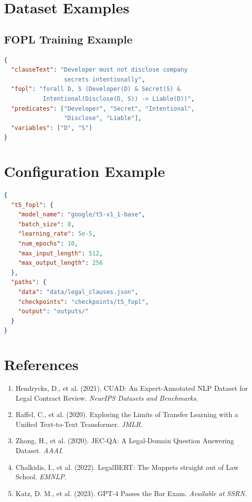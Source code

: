 \documentclass[12pt,a4paper]{article}
\begin{document}
\section{Dataset Examples}

\subsection{FOPL Training Example}

\begin{lstlisting}[language=json]
{
  "clauseText": "Developer must not disclose company 
                 secrets intentionally",
  "fopl": "forall D, S (Developer(D) & Secret(S) & 
           Intentional(Disclose(D, S)) -> Liable(D))",
  "predicates": ["Developer", "Secret", "Intentional", 
                 "Disclose", "Liable"],
  "variables": ["D", "S"]
}
\end{lstlisting}

\section{Configuration Example}

\begin{lstlisting}[language=json]
{
  "t5_fopl": {
    "model_name": "google/t5-v1_1-base",
    "batch_size": 8,
    "learning_rate": 5e-5,
    "num_epochs": 10,
    "max_input_length": 512,
    "max_output_length": 256
  },
  "paths": {
    "data": "data/legal_clauses.json",
    "checkpoints": "checkpoints/t5_fopl",
    "output": "outputs/"
  }
}
\end{lstlisting}

\section{References}

\begin{enumerate}
    \item Hendrycks, D., et al. (2021). CUAD: An Expert-Annotated NLP Dataset for Legal Contract Review. \textit{NeurIPS Datasets and Benchmarks}.
    
    \item Raffel, C., et al. (2020). Exploring the Limits of Transfer Learning with a Unified Text-to-Text Transformer. \textit{JMLR}.
    
    \item Zhong, H., et al. (2020). JEC-QA: A Legal-Domain Question Answering Dataset. \textit{AAAI}.
    
    \item Chalkidis, I., et al. (2022). LegalBERT: The Muppets straight out of Law School. \textit{EMNLP}.
    
    \item Katz, D. M., et al. (2023). GPT-4 Passes the Bar Exam. \textit{Available at SSRN}.
\end{enumerate}
\end{document}
